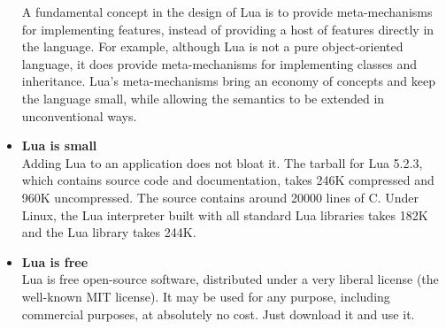 \begin{itemize}
 A fundamental concept in the design of Lua is to provide meta-mechanisms for implementing features, instead of providing a host of features directly in the language. For example, although Lua is not a pure object-oriented language, it does provide meta-mechanisms for implementing classes and inheritance. Lua's meta-mechanisms bring an economy of concepts and keep the language small, while allowing the semantics to be extended in unconventional ways.
\item \textbf{Lua is small}\\
 Adding Lua to an application does not bloat it. The tarball for Lua 5.2.3, which contains source code and documentation, takes 246K compressed and 960K uncompressed. The source contains around 20000 lines of C. Under Linux, the Lua interpreter built with all standard Lua libraries takes 182K and the Lua library takes 244K. 
\item \textbf{Lua is free}\\
 Lua is free open-source software, distributed under a very liberal license (the well-known MIT license). It may be used for any purpose, including commercial purposes, at absolutely no cost. Just download it and use it. 
\end{itemize}
